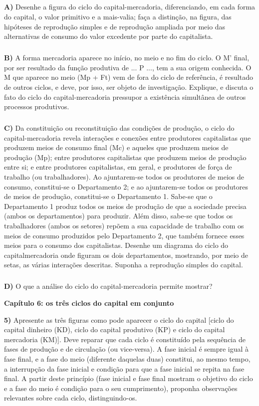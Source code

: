 \documentclass[a4paper, 12pt]{article} %
\begin{document}
\subparagraph{} \textbf{A)} Desenhe a figura do ciclo do capital-mercadoria, diferenciando, em cada forma do capital, o
valor primitivo e a mais-valia; faça a distinção, na figura, das hipóteses de reprodução simples e
de reprodução ampliada por meio das alternativas de consumo do valor excedente por parte
do capitalista.

\subparagraph{} \textbf{B)} A forma mercadoria aparece no início, no meio e no fim do ciclo. O M’ final, por ser resultado
da função produtiva de ... P ..., tem a sua origem conhecida. O M que aparece no meio (Mp +
Ft) vem de fora do ciclo de referência, é resultado de outros ciclos, e deve, por isso, ser objeto
de investigação. Explique, e discuta o fato do ciclo do capital-mercadoria pressupor a existência
simultânea de outros processos produtivos.

\subparagraph{} \textbf{C)} Da constituição ou reconstituição das condições de produção, o ciclo do capital-mercadoria
revela interações e conexões entre produtores capitalistas que produzem meios de consumo
final (Mc) e aqueles que produzem meios de produção (Mp); entre produtores capitalistas que
produzem meios de produção entre si; e entre produtores capitalistas, em geral, e produtores
de força de trabalho (ou trabalhadores). Ao ajuntarem-se todos os produtores de meios de
consumo, constitui-se o Departamento 2; e ao ajuntarem-se todos os produtores de meios de
produção, constitui-se o Departamento 1. Sabe-se que o Departamento 1 produz todos os
meios de produção de que a sociedade precisa (ambos os departamentos) para produzir. Além
disso, sabe-se que todos os trabalhadores (ambos os setores) repõem a sua capacidade de
trabalho com os meios de consumo produzidos pelo Departamento 2, que também fornece
esses meios para o consumo dos capitalistas. Desenhe um diagrama do ciclo do capitalmercadoria onde figuram os dois departamentos, mostrando, por meio de setas, as várias
interações descritas. Suponha a reprodução simples do capital.

\subparagraph{} \textbf{D)} O que a análise do ciclo do capital-mercadoria permite mostrar?

\vspace{0.5cm}

\par \textbf{Capítulo 6: os três ciclos do capital em conjunto}

\vspace{0.5cm}

\par \textbf{5)} Apresente as três figuras como pode aparecer o ciclo do capital [ciclo do capital dinheiro (KD), ciclo
do capital produtivo (KP) e ciclo do capital mercadoria (KM)]. Deve reparar que cada ciclo é constituído
pela sequência de fases de produção e de circulação (ou vice-versa). A fase inicial é sempre igual à fase
final, e a fase do meio (diferente daquelas duas) constitui, ao mesmo tempo, a interrupção da fase
inicial e condição para que a fase inicial se repita na fase final. A partir deste princípio (fase inicial e fase
final mostram o objetivo do ciclo e a fase do meio é condição para o seu cumprimento), proponha
observações relevantes sobre cada ciclo, distinguindo-os.
\end{document}
